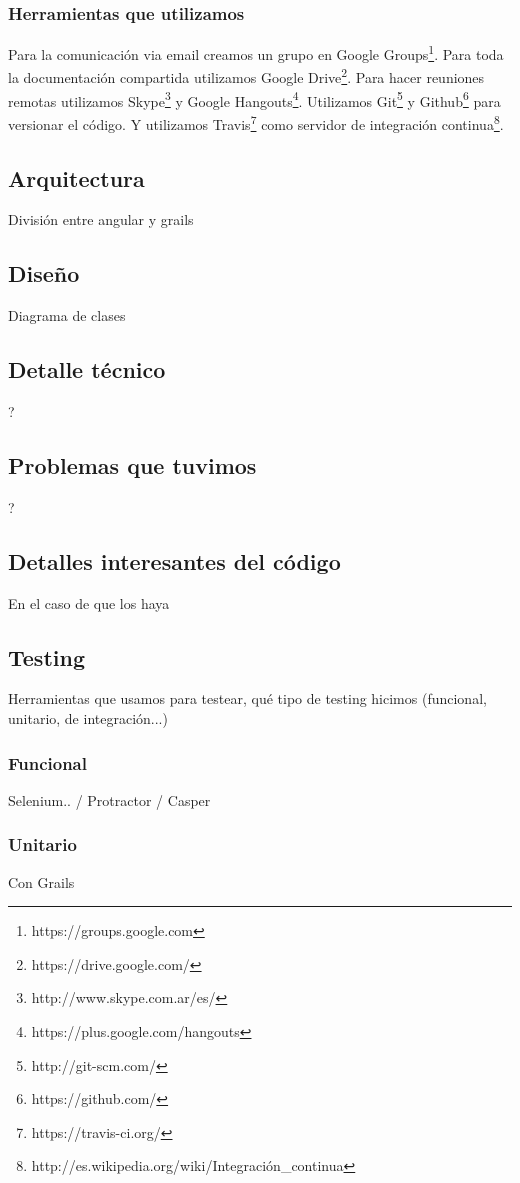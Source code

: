 \subsubsection{Herramientas que utilizamos}
Para la comunicación via email creamos un grupo en Google Groups\footnote{https://groups.google.com}.
Para toda la documentación compartida utilizamos Google Drive\footnote{https://drive.google.com/}. Para hacer reuniones remotas utilizamos Skype\footnote{http://www.skype.com.ar/es/} y Google Hangouts\footnote{https://plus.google.com/hangouts}. Utilizamos Git\footnote{http://git-scm.com/} y Github\footnote{https://github.com/} para versionar el código. Y utilizamos Travis\footnote{https://travis-ci.org/} como servidor de integración continua\footnote{http://es.wikipedia.org/wiki/Integración\_continua}.
\subsection{Arquitectura}
División entre angular y grails
 
\subsection{Diseño}
Diagrama de clases
\subsection{Detalle técnico}
?

\subsection{Problemas que tuvimos}
?

\subsection{Detalles interesantes del código}
En el caso de que los haya 




\subsection{Testing}
Herramientas que usamos para testear, qué tipo de testing hicimos (funcional, unitario, de integración...)
\subsubsection{Funcional}
Selenium.. / Protractor / Casper
\subsubsection{Unitario}
Con Grails
